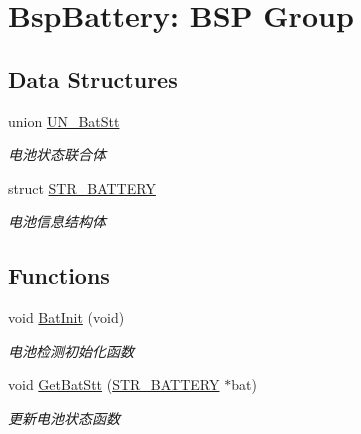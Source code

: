 \hypertarget{group___b_e_t_t_e_r_y}{\section{\-Bsp\-Battery\-: \-B\-S\-P \-Group}
\label{group___b_e_t_t_e_r_y}
}
\subsection*{\-Data \-Structures}
\begin{DoxyCompactItemize}
\item 
union \hyperlink{union_u_n___bat_stt}{\-U\-N\-\_\-\-Bat\-Stt}
\begin{DoxyCompactList}\small\item\em 电池状态联合体 \end{DoxyCompactList}\item 
struct \hyperlink{struct_s_t_r___b_a_t_t_e_r_y}{\-S\-T\-R\-\_\-\-B\-A\-T\-T\-E\-R\-Y}
\begin{DoxyCompactList}\small\item\em 电池信息结构体 \end{DoxyCompactList}\end{DoxyCompactItemize}
\subsection*{\-Functions}
\begin{DoxyCompactItemize}
\item 
void \hyperlink{group___b_e_t_t_e_r_y_ga9daea963d01ab321f8f2cb6f2b8932b2}{\-Bat\-Init} (void)
\begin{DoxyCompactList}\small\item\em 电池检测初始化函数 \end{DoxyCompactList}\item 
void \hyperlink{group___b_e_t_t_e_r_y_gad11b24ac1b2d2f4ad3c24201b9c7a244}{\-Get\-Bat\-Stt} (\hyperlink{struct_s_t_r___b_a_t_t_e_r_y}{\-S\-T\-R\-\_\-\-B\-A\-T\-T\-E\-R\-Y} $\ast$bat)
\begin{DoxyCompactList}\small\item\em 更新电池状态函数 \end{DoxyCompactList}\end{DoxyCompactItemize}
